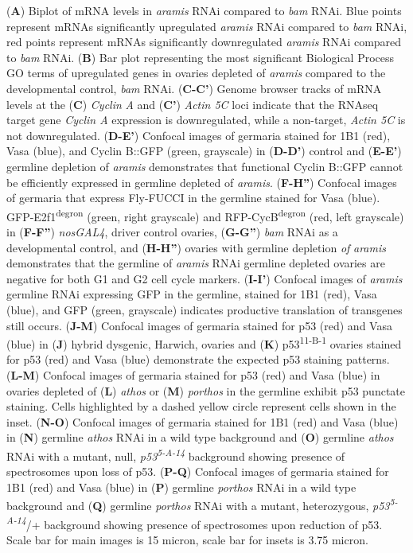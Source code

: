 \documentclass[12pt,oneside]{reedthesis}
\begin{document}
(\textbf{A}) Biplot of mRNA levels in
\emph{aramis} RNAi compared to \emph{bam} RNAi. Blue points represent mRNAs
significantly upregulated \emph{aramis} RNAi compared to \emph{bam} RNAi, red
points represent mRNAs significantly downregulated \emph{aramis} RNAi
compared to \emph{bam} RNAi. (\textbf{B}) Bar plot representing the most
significant Biological Process GO terms of upregulated genes in ovaries
depleted of \emph{aramis} compared to the developmental control, \emph{bam} RNAi.
(\textbf{C-C'}) Genome browser tracks of mRNA levels at the (\textbf{C}) \emph{Cyclin}
\emph{A} and (\textbf{C'}) \emph{Actin 5C} loci indicate that the RNAseq target gene
\emph{Cyclin A} expression is downregulated, while a non-target, \emph{Actin 5C}
is not downregulated. (\textbf{D-E'}) Confocal images of germaria stained for
1B1 (red), Vasa (blue), and Cyclin B::GFP (green, grayscale) in
(\textbf{D-D'}) control and (\textbf{E-E'}) germline depletion of \emph{aramis}
demonstrates that functional Cyclin B::GFP cannot be efficiently
expressed in germline depleted of \emph{aramis}. (\textbf{F-H''}) Confocal images
of germaria that express Fly-FUCCI in the germline stained for Vasa
(blue). GFP-E2f1\textsuperscript{degron} (green, right grayscale) and RFP-CycB\textsuperscript{degron}
(red, left grayscale) in (\textbf{F-F''}) \emph{nosGAL4}, driver control ovaries,
(\textbf{G-G''}) \emph{bam} RNAi as a developmental control, and (\textbf{H-H''})
ovaries with germline depletion \emph{of} \emph{aramis} demonstrates that the
germline of \emph{aramis} RNAi germline depleted ovaries are negative for
both G1 and G2 cell cycle markers. (\textbf{I-I'}) Confocal images of
\emph{aramis} germline RNAi expressing GFP in the germline, stained for 1B1
(red), Vasa (blue), and GFP (green, grayscale) indicates productive
translation of transgenes still occurs. (\textbf{J-M}) Confocal images of
germaria stained for p53 (red) and Vasa (blue) in (\textbf{J}) hybrid
dysgenic, Harwich, ovaries and (\textbf{K}) p53\textsuperscript{11-B-1} ovaries stained for
p53 (red) and Vasa (blue) demonstrate the expected p53 staining
patterns. (\textbf{L-M}) Confocal images of germaria stained for p53 (red)
and Vasa (blue) in ovaries depleted of (\textbf{L}) \emph{athos} or (\textbf{M})
\emph{porthos} in the germline exhibit p53 punctate staining. Cells
highlighted by a dashed yellow circle represent cells shown in the
inset. (\textbf{N-O}) Confocal images of germaria stained for 1B1 (red) and
Vasa (blue) in (\textbf{N}) germline \emph{athos} RNAi in a wild type background
and (\textbf{O}) germline \emph{athos} RNAi with a mutant, null, \emph{p53\textsuperscript{5-A-14}}
background showing presence of spectrosomes upon loss of p53. (\textbf{P-Q})
Confocal images of germaria stained for 1B1 (red) and Vasa (blue) in
(\textbf{P}) germline \emph{porthos} RNAi in a wild type background and (\textbf{Q})
germline \emph{porthos} RNAi with a mutant, heterozygous, \emph{p53\textsuperscript{5-A-14}}/+
background showing presence of spectrosomes upon reduction of p53. Scale
bar for main images is 15 micron, scale bar for insets is 3.75 micron.
\end{document}
